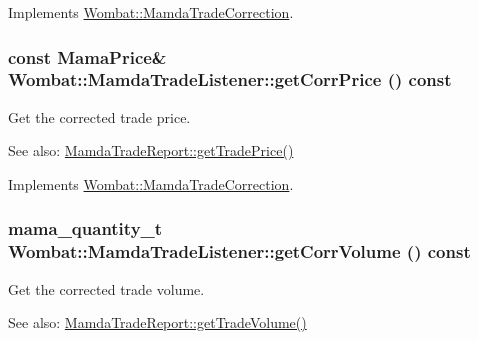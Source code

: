 Implements \hyperlink{classWombat_1_1MamdaTradeCorrection_6e5f69c0e6bb8cf2a4a2d25ef83f7aac}{Wombat::Mamda\-Trade\-Correction}.\hypertarget{classWombat_1_1MamdaTradeListener_221a0761538521f3ea2aea124541d07f}{
\subsubsection[getCorrPrice]{\setlength{\rightskip}{0pt plus 5cm}const Mama\-Price\& Wombat::Mamda\-Trade\-Listener::get\-Corr\-Price () const}}
\label{classWombat_1_1MamdaTradeListener_221a0761538521f3ea2aea124541d07f}


Get the corrected trade price. 

\begin{Desc}
\item[See also:]\hyperlink{classWombat_1_1MamdaTradeReport_97a38026a45edb298ffe62530d43cde4}{Mamda\-Trade\-Report::get\-Trade\-Price()} \end{Desc}


Implements \hyperlink{classWombat_1_1MamdaTradeCorrection_0f93bfcc5a56537cc99a48238e9e6e49}{Wombat::Mamda\-Trade\-Correction}.\hypertarget{classWombat_1_1MamdaTradeListener_7034a77bc663978a9968c2e9f7a9184c}{
\subsubsection[getCorrVolume]{\setlength{\rightskip}{0pt plus 5cm}mama\_\-quantity\_\-t Wombat::Mamda\-Trade\-Listener::get\-Corr\-Volume () const}}
\label{classWombat_1_1MamdaTradeListener_7034a77bc663978a9968c2e9f7a9184c}


Get the corrected trade volume. 

\begin{Desc}
\item[See also:]\hyperlink{classWombat_1_1MamdaTradeReport_167dd8f71093494ce5d0ff7a85739cbf}{Mamda\-Trade\-Report::get\-Trade\-Volume()} \end{Desc}


